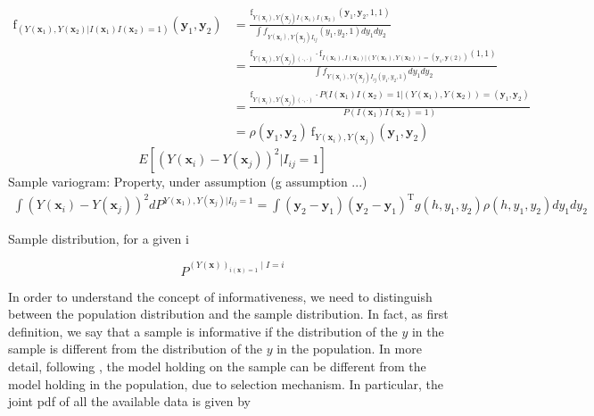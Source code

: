 \documentclass[12pt]{article}
\theoremstyle{definition}
\theoremstyle{remark}
\newcommand{\density}{\mathrm{f}}
\newcommand{\position}{\mathbf{x}}
\newcommand{\Signal}{Y}
\newcommand{\signal}{\mathbf{y}}
\begin{document}
\begin{equation}
\begin{split}
    \density_{(Y(\mathbf{x}_{1}),Y(\mathbf{x}_{2})|I(\position_1)I(\position_2)=1)}\left(\signal_1,\signal_2\right)&=\frac{\density_{Y(\mathbf{x}_{i}),Y(\mathbf{x}_{j})I(\position_1)I(\position_2)}(\signal_1,\signal_2,1,1)}{\int{f_{Y(\mathbf{x}_{i}),Y(\mathbf{x}_{j})I_{ij}}(y_{1},y_{2},1)}d y_{1}d y_{2}}\\
    &=\frac{\density_{Y(\mathbf{x}_{i}),Y(\mathbf{x}_{j})(\cdot,\cdot)}\cdot \density_{I(\position_1),I(\position_1)|(Y(\mathbf{x}_{1}),Y(\mathbf{x}_{2}))=(\signal_1,\signal(2))}(1,1)}{\int{f_{Y(\mathbf{x}_{i}),Y(\mathbf{x}_{j})I_{ij}(y_{1},y_{2},1)}d y_{1}d y_{2}}}\\
    &=\frac{\density_{Y(\mathbf{x}_{i}),Y(\mathbf{x}_{j})(\cdot,\cdot)}\cdot P(I(\position_1)I(\position_2)=1|(Y(\mathbf{x}_{1}),Y(\mathbf{x}_{2}))=(\signal_1,\signal_2)}{P(I(\position_1)I(\position_2)=1)}\\
    &=\rho(\signal_1,\signal_2)~\density_{Y(\mathbf{x}_{i}),Y(\mathbf{x}_{j})}(\signal_1,\signal_2) 
\end{split}
\end{equation}
\begin{equation}
    E[(Y(\mathbf{x}_{i})-Y(\mathbf{x}_{j}))^2|I_{ij}=1]
\end{equation}
Sample variogram: Property, under assumption (g assumption ...)
\begin{equation}
    \begin{split}
        \int{(Y(\mathbf{x}_{i})-Y(\mathbf{x}_{j}))^2dP^{Y(\mathbf{x}_{1}),Y(\mathbf{x}_{j})|I_{ij}=1}}=\int{\left(\signal_2-\signal_1\right)\left(\signal_2-\signal_1\right)^{\mathrm{T}}g(h,y_{1},y_{2})\rho(h,y_{1},y_{2})d y_{1} d y_{2}}
    \end{split}
\end{equation}

Sample distribution, for a given i

$$P^{(\Signal(\position))_{i(\position)=1}\mid I=i}$$


In order to understand the concept of informativeness, we need to distinguish between the population distribution and the sample distribution. In fact, as first definition, we say that a sample is informative if the distribution of the $y$ in the sample is different from the distribution of the $y$ in the population. In more detail, following \cite{pfefferman_1992}, the model holding on the sample can be different from the model holding in the population, due to selection mechanism. In particular, the joint pdf of all the available data is given by
\end{document}
